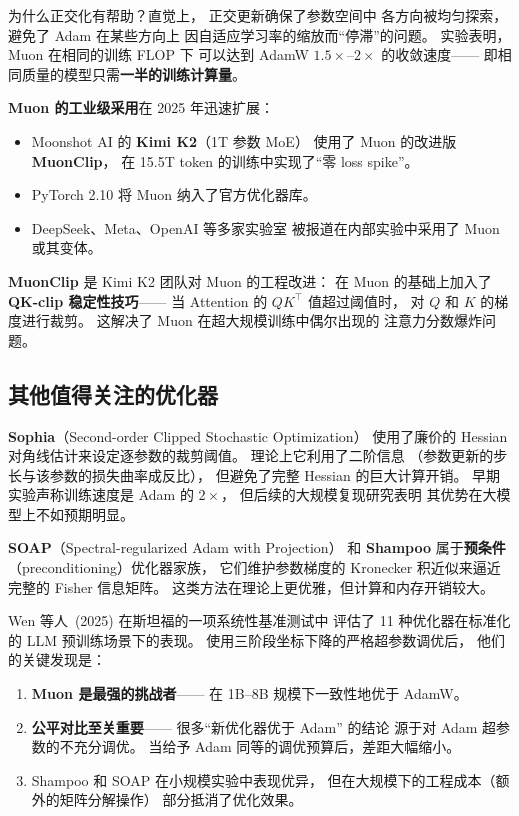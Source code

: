 为什么正交化有帮助？直觉上，
正交更新确保了参数空间中
各方向被均匀探索，避免了 Adam 在某些方向上
因自适应学习率的缩放而``停滞''的问题。
实验表明，Muon 在相同的训练 FLOP 下
可以达到 AdamW $1.5\times$--$2\times$ 的收敛速度——
即相同质量的模型只需\textbf{一半的训练计算量}。

\textbf{Muon 的工业级采用}在 2025 年迅速扩展：
\begin{itemize}[noitemsep]
  \item Moonshot AI 的 \textbf{Kimi K2}（1T 参数 MoE）
        使用了 Muon 的改进版 \textbf{MuonClip}，
        在 15.5T token 的训练中实现了``零 loss spike''。
  \item PyTorch 2.10 将 Muon 纳入了官方优化器库。
  \item DeepSeek、Meta、OpenAI 等多家实验室
        被报道在内部实验中采用了 Muon 或其变体。
\end{itemize}

\textbf{MuonClip} 是 Kimi K2 团队对 Muon 的工程改进：%
在 Muon 的基础上加入了\textbf{QK-clip 稳定性技巧}——
当 Attention 的 $QK^\top$ 值超过阈值时，
对 $Q$ 和 $K$ 的梯度进行裁剪。
这解决了 Muon 在超大规模训练中偶尔出现的
注意力分数爆炸问题。

\subsection{其他值得关注的优化器}

\textbf{Sophia}（Second-order Clipped Stochastic Optimization）
使用了廉价的 Hessian 对角线估计来设定逐参数的裁剪阈值。
理论上它利用了二阶信息
（参数更新的步长与该参数的损失曲率成反比），
但避免了完整 Hessian 的巨大计算开销。
早期实验声称训练速度是 Adam 的 $2\times$，
但后续的大规模复现研究表明
其优势在大模型上不如预期明显。

\textbf{SOAP}（Spectral-regularized Adam with Projection）
和 \textbf{Shampoo} 属于\textbf{预条件}
（preconditioning）优化器家族，
它们维护参数梯度的 Kronecker 积近似来逼近完整的 Fisher 信息矩阵。
这类方法在理论上更优雅，但计算和内存开销较大。

Wen 等人~(2025) 在斯坦福的一项系统性基准测试中%
评估了 11 种优化器在标准化的 LLM 预训练场景下的表现。
使用三阶段坐标下降的严格超参数调优后，
他们的关键发现是：
\begin{enumerate}[noitemsep]
  \item \textbf{Muon 是最强的挑战者}——
        在 1B--8B 规模下一致性地优于 AdamW。
  \item \textbf{公平对比至关重要}——
        很多``新优化器优于 Adam'' 的结论
        源于对 Adam 超参数的不充分调优。
        当给予 Adam 同等的调优预算后，差距大幅缩小。
  \item Shampoo 和 SOAP 在小规模实验中表现优异，
        但在大规模下的工程成本（额外的矩阵分解操作）
        部分抵消了优化效果。
\end{enumerate}

